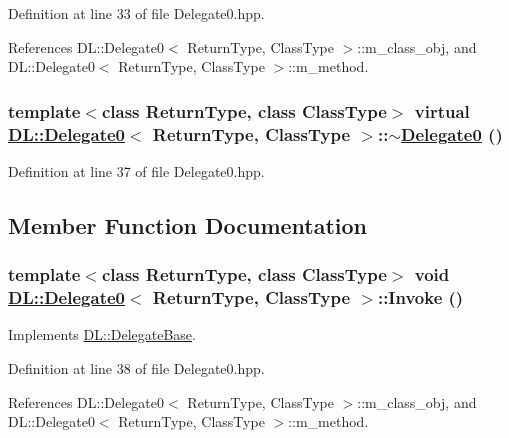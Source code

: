 Definition at line 33 of file Delegate0.hpp.

References DL::Delegate0$<$ Return\-Type, Class\-Type $>$::m\_\-class\_\-obj, and DL::Delegate0$<$ Return\-Type, Class\-Type $>$::m\_\-method.\hypertarget{classDL_1_1Delegate0_a1}{
\subsubsection[$\sim$Delegate0]{\setlength{\rightskip}{0pt plus 5cm}template$<$class Return\-Type, class Class\-Type$>$ virtual \hyperlink{classDL_1_1Delegate0}{DL::Delegate0}$<$ Return\-Type, Class\-Type $>$::$\sim$\hyperlink{classDL_1_1Delegate0}{Delegate0} ()}}
\label{classDL_1_1Delegate0_a1}




Definition at line 37 of file Delegate0.hpp.

\subsection{Member Function Documentation}
\hypertarget{classDL_1_1Delegate0_a2}{
\subsubsection[Invoke]{\setlength{\rightskip}{0pt plus 5cm}template$<$class Return\-Type, class Class\-Type$>$ void \hyperlink{classDL_1_1Delegate0}{DL::Delegate0}$<$ Return\-Type, Class\-Type $>$::Invoke ()}}
\label{classDL_1_1Delegate0_a2}




Implements \hyperlink{classDL_1_1DelegateBase_a2}{DL::Delegate\-Base}.

Definition at line 38 of file Delegate0.hpp.

References DL::Delegate0$<$ Return\-Type, Class\-Type $>$::m\_\-class\_\-obj, and DL::Delegate0$<$ Return\-Type, Class\-Type $>$::m\_\-method.

